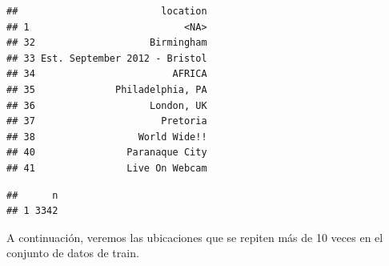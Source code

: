 \documentclass[
]{article}
\newenvironment{Shaded}{\begin{snugshade}}{\end{snugshade}}
\newcommand{\DecValTok}[1]{\textcolor[rgb]{0.00,0.00,0.81}{#1}}
\newcommand{\KeywordTok}[1]{\textcolor[rgb]{0.13,0.29,0.53}{\textbf{#1}}}
\newcommand{\NormalTok}[1]{#1}
\newcommand{\OperatorTok}[1]{\textcolor[rgb]{0.81,0.36,0.00}{\textbf{#1}}}
\newcommand{\StringTok}[1]{\textcolor[rgb]{0.31,0.60,0.02}{#1}}
\begin{document}
\begin{Shaded}
\end{Shaded}

\begin{verbatim}
##                         location
## 1                           <NA>
## 32                    Birmingham
## 33 Est. September 2012 - Bristol
## 34                        AFRICA
## 35              Philadelphia, PA
## 36                    London, UK
## 37                      Pretoria
## 38                  World Wide!!
## 40                Paranaque City
## 41                Live On Webcam
\end{verbatim}

\begin{Shaded}
\end{Shaded}

\begin{verbatim}
##      n
## 1 3342
\end{verbatim}

A continuación, veremos las ubicaciones que se repiten más de 10 veces
en el conjunto de datos de train.

\begin{Shaded}
\end{Shaded}
\end{document}
